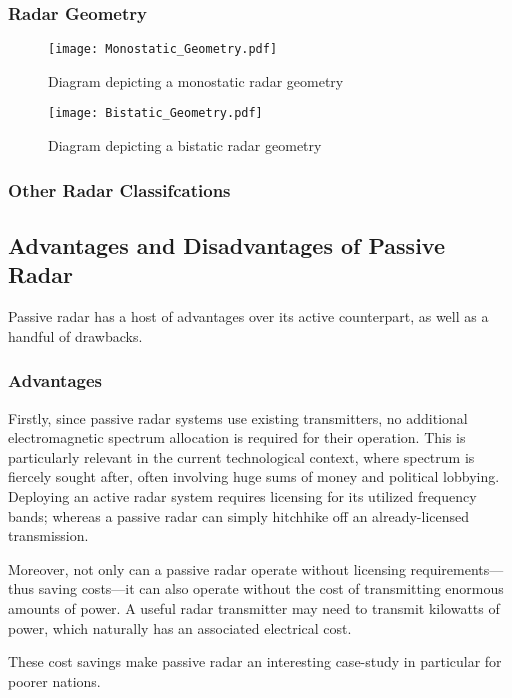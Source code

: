 \documentclass[class=report,11pt,crop=false]{standalone}
\begin{document}
\subsubsection{Radar Geometry}

\begin{figure}[htbp]
    \centering
    \texttt{[image: Monostatic\_Geometry.pdf]}
    \caption{Diagram depicting a monostatic radar geometry}
    \label{fig:Monostatic_Geometry}
\end{figure}

\begin{figure}[htbp]
    \centering
    \texttt{[image: Bistatic\_Geometry.pdf]}
    \caption{Diagram depicting a bistatic radar geometry}
    \label{fig:Bistatic_Geometry}
\end{figure}

\subsubsection{Other Radar Classifcations}

\subsection{Advantages and Disadvantages of Passive Radar}
Passive radar has a host of advantages over its active counterpart, as well as a handful of drawbacks.

\subsubsection{Advantages}
Firstly, since passive radar systems use existing transmitters, no additional electromagnetic spectrum allocation is required for their operation. This is particularly relevant in the current technological context, where spectrum is fiercely sought after, often involving huge sums of money and political lobbying. Deploying an active radar system requires licensing for its utilized frequency bands; whereas a passive radar can simply hitchhike off an already-licensed transmission.

Moreover, not only can a passive radar operate without licensing requirements---thus saving costs---it can also operate without the cost of transmitting enormous amounts of power. A useful radar transmitter may need to transmit kilowatts of power, which naturally has an associated electrical cost.

These cost savings make passive radar an interesting case-study in particular for poorer nations. 
\end{document}
